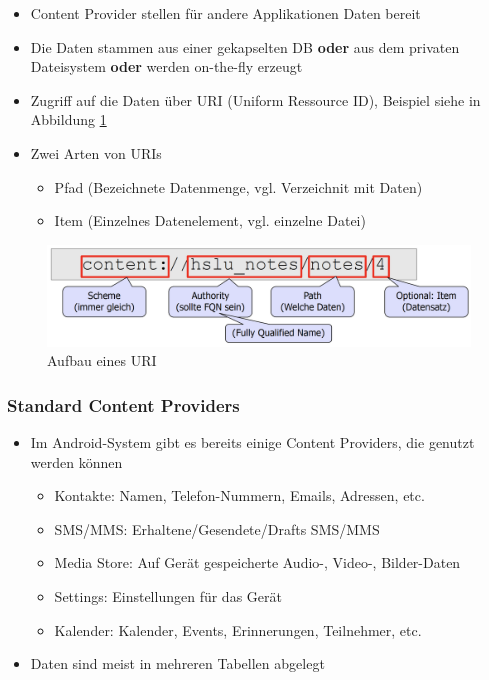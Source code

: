 \documentclass[a4paper]{article}
\begin{document}
\begin{itemize}
	\item Content Provider stellen für andere Applikationen Daten bereit
	\item Die Daten stammen aus einer gekapselten DB \textbf{oder} aus dem privaten Dateisystem \textbf{oder} werden on-the-fly erzeugt
	\item Zugriff auf die Daten über URI (Uniform Ressource ID), Beispiel siehe in Abbildung \ref{fig:uri_content}
	\item Zwei Arten von URIs
		\begin{itemize}
			\item Pfad (Bezeichnete Datenmenge, vgl. Verzeichnit mit Daten)
			\item Item (Einzelnes Datenelement, vgl. einzelne Datei)
		\end{itemize}
\end{itemize}

\begin{figure}[htb!]
	\centering
	\includegraphics[width=.8\textwidth]{img/content_uri.png}
	\caption{Aufbau eines URI}
	\label{fig:uri_content}
\end{figure}
	
\subsubsection{Standard Content Providers}

\begin{itemize}
	\item Im Android-System gibt es bereits einige Content Providers, die genutzt werden können
		\begin{itemize}
			\item Kontakte: Namen, Telefon-Nummern, Emails, Adressen, etc.
			\item SMS/MMS: Erhaltene/Gesendete/Drafts SMS/MMS
			\item Media Store: Auf Gerät gespeicherte Audio-, Video-, Bilder-Daten
			\item Settings: Einstellungen für das Gerät
			\item Kalender: Kalender, Events, Erinnerungen, Teilnehmer, etc. 
		\end{itemize}
	\item Daten sind meist in mehreren Tabellen abgelegt
\end{itemize}	
\end{document}
